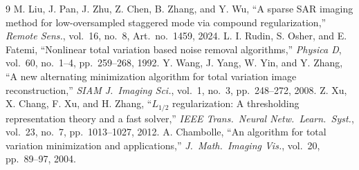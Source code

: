 \documentclass[11pt,a4paper]{article}
\begin{document}
\newpage
\begin{thebibliography}{9}
M. Liu, J. Pan, J. Zhu, Z. Chen, B. Zhang, and Y. Wu, ``A sparse SAR imaging method for low-oversampled staggered mode via compound regularization,'' \emph{Remote Sens.}, vol.~16, no.~8, Art.~no.~1459, 2024.
L. I. Rudin, S. Osher, and E. Fatemi, ``Nonlinear total variation based noise removal algorithms,'' \emph{Physica D}, vol.~60, no.~1--4, pp.~259--268, 1992.
Y. Wang, J. Yang, W. Yin, and Y. Zhang, ``A new alternating minimization algorithm for total variation image reconstruction,'' \emph{SIAM J.\ Imaging Sci.}, vol.~1, no.~3, pp.~248--272, 2008.
Z. Xu, X. Chang, F. Xu, and H. Zhang, ``$L_{1/2}$ regularization: A thresholding representation theory and a fast solver,'' \emph{IEEE Trans.\ Neural Netw.\ Learn.\ Syst.}, vol.~23, no.~7, pp.~1013--1027, 2012.
A. Chambolle, ``An algorithm for total variation minimization and applications,'' \emph{J.\ Math.\ Imaging Vis.}, vol.~20, pp.~89--97, 2004.
\end{thebibliography}
\end{document}

